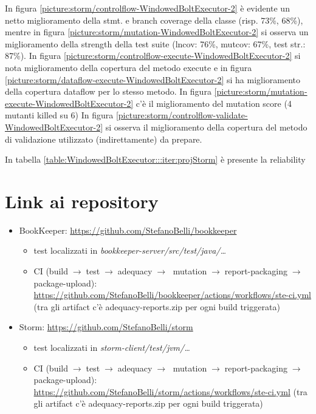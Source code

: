 \documentclass[10pt, a4paper]{article}
\newcommand{\gettablelabel}[5]{table:#1:#2:#3:iter#4:proj#5}
\newcommand{\getreltablelabel}[2]{\gettablelabel{#1}{}{}{}{#2}}
\newcommand{\getpicturelabel}[1]{picture:#1}
\def\storm{Storm}
\begin{document}
	
	In figura \ref{\getpicturelabel{storm/controlflow-WindowedBoltExecutor-2}} è evidente un netto miglioramento della stmt. e
	branch coverage della classe (risp. 73\%, 68\%), mentre in figura 
	\ref{\getpicturelabel{storm/mutation-WindowedBoltExecutor-2}} si osserva
	un miglioramento della strength della test suite (lncov: 76\%, mutcov: 67\%, test str.: 87\%).
	In figura \ref{\getpicturelabel{storm/controlflow-execute-WindowedBoltExecutor-2}} si nota miglioramento della copertura
	del metodo execute e in figura \ref{\getpicturelabel{storm/dataflow-execute-WindowedBoltExecutor-2}} si ha miglioramento
	della copertura dataflow per lo stesso metodo.
	In figura \ref{\getpicturelabel{storm/mutation-execute-WindowedBoltExecutor-2}} c'è il miglioramento del mutation score
	(4 mutanti killed su 6)
	In figura \ref{\getpicturelabel{storm/controlflow-validate-WindowedBoltExecutor-2}} si osserva il miglioramento della 
	copertura del metodo di validazione utilizzato (indirettamente) da prepare.
	
	In tabella \ref{\getreltablelabel{WindowedBoltExecutor}{\storm}} è presente la reliability
	
	\newpage
	\section{Link ai repository}
	\begin{itemize}
		\item BookKeeper: \url{https://github.com/StefanoBelli/bookkeeper}
		\begin{itemize}
			\item test localizzati in \textit{bookkeeper-server/src/test/java/\dots}
			\item CI (build$\;\rightarrow\;$test$\;\rightarrow\;$adequacy$\;\rightarrow\;$
			mutation$\;\rightarrow\;$report-packaging$\;\rightarrow\;$package-upload): 
			\url{https://github.com/StefanoBelli/bookkeeper/actions/workflows/ste-ci.yml} 
			(tra gli artifact c'è adequacy-reports.zip per ogni build triggerata)
		\end{itemize}
		\item Storm: \url{https://github.com/StefanoBelli/storm}
		\begin{itemize}
			\item test localizzati in \textit{storm-client/test/jvm/\dots}
			\item CI (build$\;\rightarrow\;$test$\;\rightarrow\;$adequacy$\;\rightarrow\;$
			mutation$\;\rightarrow\;$report-packaging$\;\rightarrow\;$package-upload): 
			\url{https://github.com/StefanoBelli/storm/actions/workflows/ste-ci.yml}
			(tra gli artifact c'è adequacy-reports.zip per ogni build triggerata)
		\end{itemize}
	\end{itemize}
	
\end{document}

